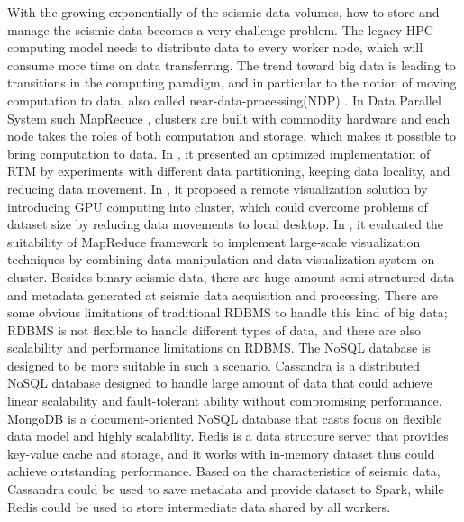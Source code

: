 With the growing exponentially of the seismic data volumes, how to store and manage the seismic data becomes a very challenge problem. The legacy HPC computing model needs to distribute data to every worker node, which will consume more time on data transferring. The trend toward big data is leading to transitions in the computing paradigm, and in particular to the notion of moving computation to data, also called near-data-processing(NDP) \cite{6871738BalasubramonianNDP}. In Data Parallel System such MapRecuce \cite{6217449GuoDataLocalityMapReduce}, clusters are built with commodity hardware and each node takes the roles of both computation and storage, which makes it possible to bring computation to data. In \cite{6267846PerroneReducingDataMovement}, it presented an optimized implementation of RTM by experiments with different data partitioning, keeping data locality, and reducing data movement. In \cite{NextDataCenterVisualization}, it proposed a remote visualization solution by introducing GPU computing into cluster, which could overcome problems of dataset size by reducing data movements to local desktop. In \cite{6092321VoParaVisMapReduce}, it evaluated the suitability of MapReduce framework to implement large-scale visualization techniques by combining data manipulation and data visualization system on cluster. Besides  binary seismic data, there are huge amount semi-structured data and metadata generated at seismic data acquisition and processing. There are some obvious limitations of traditional RDBMS to handle this kind of big data; RDBMS is not flexible to handle different types of data, and there are also scalability and performance limitations on RDBMS. The NoSQL database\cite{ApacheHBase} is designed to be more suitable in such a scenario. Cassandra \cite{ApacheCassandra} is a distributed NoSQL database designed to handle large amount of data that could achieve linear scalability and fault-tolerant ability without compromising performance. MongoDB \cite{MongoDBNoSQL} is a document-oriented NoSQL database that casts focus on flexible data model and highly scalability. Redis \cite{RedisNoSQL} is a data structure server that provides key-value cache and storage, and it works with in-memory dataset thus could achieve outstanding performance. Based on the characteristics of seismic data, Cassandra could be used to save metadata and provide dataset to Spark, while Redis could be used to store intermediate data shared by all workers.

